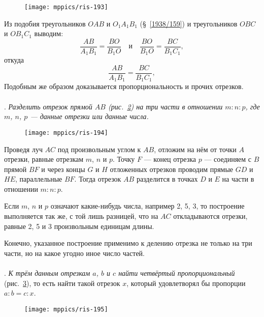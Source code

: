 \begin{figure}[!ht]
\centering
\texttt{[image: mppics/ris-193]}
\caption{}\label{1938/ris-193}
\end{figure}

Из подобия треугольников $OAB$ и $O_1A_1B_1$ (§~\ref{1938/159}) и треугольников $OBC$ и $OB_1C_1$ выводим:
\[\frac{AB}{A_1B_1}=\frac{BO}{B_1O}
\quad\text{и}\quad
\frac{BO}{B_1O}=\frac{BC}{B_1C_1},
\]
откуда
\[\frac{AB}{A_1B_1}=\frac{BC}{B_1C_1},
\]
Подобным же образом доказывается пропорциональность и прочих отрезков.

\paragraph{}\label{1938/184}
.
\emph{Разделить отрезок прямой $AB$ \emph{(рис.~\ref{1938/ris-194})} на три части в отношении $m:n:p$, где $m$, $n$, $p$ — данные отрезки или данные числа.}

\begin{figure}[!ht]
\centering
\texttt{[image: mppics/ris-194]}
\caption{}\label{1938/ris-194}
\end{figure}

Проведя луч $AC$ под произвольным углом к $AB$, отложим на нём от точки $A$ отрезки, равные отрезкам $m$, $n$ и $p$.
Точку $F$ — конец отрезка $p$ — соединяем с $B$ прямой $BF$ и через концы $G$ и $H$ отложенных отрезков проводим прямые $GD$ и $HE$, параллельные $BF$.
Тогда отрезок $AB$ разделится в точках $D$ и $E$ на части в отношении $m:n:p$.

Если $m$, $n$ и $p$ означают какие-нибудь числа, например 2, 5, 3, то построение выполняется так же, с той лишь разницей, что на $AC$ откладываются отрезки, равные 2, 5 и 3 произвольным единицам длины.

Конечно, указанное построение применимо к делению отрезка не только на три части, но на какое угодно иное число частей.

\paragraph{}\label{1938/185}
.
\emph{К трём данным отрезкам $a$, $b$ и $c$ найти четвёртый пропорциональный} (рис.~\ref{1938/ris-195}), то есть
найти такой отрезок $x$, который удовлетворял бы пропорции $a:b=c:x$.

\begin{figure}[!ht]
\centering
\texttt{[image: mppics/ris-195]}
\caption{}\label{1938/ris-195}
\end{figure}

